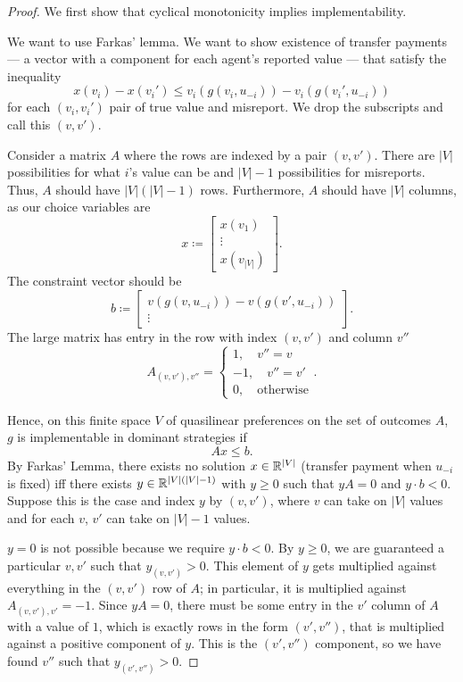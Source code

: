 \begin{proof}
	We first show that cyclical monotonicity implies implementability.

	We want to use Farkas' lemma. We want to show existence of transfer payments --- a vector with a component for each agent's reported value --- that satisfy the inequality \[
		x(v_i) - x(v_i') \le v_i\left( g(v_i,u_{-i}) \right) - v_i\left( g(v_i',u_{-i}) \right)
	\] for each $(v_i,v_i')$ pair of true value and misreport. We drop the subscripts and call this $(v,v')$.

	Consider a matrix $A$ where the rows are indexed by a pair $(v,v')$. There are $\left| V \right|$ possibilities for what $i$'s value can be and $\left| V \right|-1$ possibilities for misreports. Thus, $A$ should have $\left| V \right|\left( \left| V \right|- 1 \right)$ rows. Furthermore, $A$ should have $\left| V \right|$ columns, as our choice variables are \[
		x\coloneqq \begin{bmatrix}
		x(v_1) \\
		\vdots \\ x(v_{\left| V \right|})
		\end{bmatrix} 
	.\] The constraint vector should be \[
		b \coloneqq \begin{bmatrix}
		v\left( g(v,u_{-i}) \right) - v \left( g\left( v',u_{-i} \right) \right) \\
		\vdots	
		\end{bmatrix} 
	.\] The large matrix has entry in the row with index $(v,v')$ and column $v''$ \[
		A_{(v,v'), v''} = \begin{cases}
			1, \quad v'' = v \\
			-1, \quad v'' = v' \\
			0, \quad \text{otherwise}
		\end{cases}
	.\] 

	Hence, on this finite space $V$ of quasilinear preferences on the set of outcomes $A$, $g$ is implementable in dominant strategies if \[
		Ax \le b
	.\] 
	By Farkas' Lemma, there exists no solution $x \in \mathbb{R}^{\left| V \right|}$ (transfer payment when $u_{-i}$ is fixed) iff there exists $y \in \mathbb{R}^{\left| V \right|\left( \left| V \right| - 1 \right)}$ with $y \ge 0$ such that $yA = 0$ and $y \cdot b < 0$. Suppose this is the case and index $y$ by $(v,v')$, where $v$ can take on $\left| V \right|$ values and for each $v$, $v'$ can take on $\left| V \right|-1$ values.

	$y=0$ is not possible because we require $y \cdot b < 0$. By $y \ge 0$, we are guaranteed a particular $v,v'$ such that $y_{(v,v')} > 0$. This element of $y$ gets multiplied against everything in the $(v,v')$ row of $A$; in particular, it is multiplied against $A_{(v,v'),v'} = -1$. Since $yA = 0$, there must be some entry in the $v'$ column of $A$ with a value of $1$, which is exactly rows in the form $(v',v'')$, that is multiplied against a positive component of $y$. This is the $(v',v'')$ component, so we have found $v''$ such that $y_{(v',v'')} > 0$.


\end{proof}
